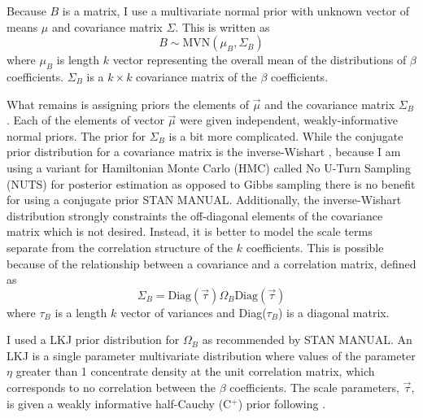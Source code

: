 \documentclass[12pt,letterpaper]{article}
\begin{document}
Because \(B\) is a matrix, I use a multivariate normal prior with unknown vector of means \(\mu\) and covariance matrix \(\Sigma\). This is written as 
\begin{equation}
  B \sim \mathrm{MVN}(\mu_{B}, \Sigma_{B})
  \label{eq:beta_prior}
\end{equation}
where \(\mu_{B}\) is length \(k\) vector representing the overall mean of the distributions of \(\beta\) coefficients. \(\Sigma_{B}\) is a \(k \times k\) covariance matrix of the \(\beta\) coefficients.

What remains is assigning priors the elements of \(\vec{\mu}\) and the covariance matrix \(\Sigma_{B}\). Each of the elements of vector \(\vec{\mu}\) were given independent, weakly-informative normal priors. The prior for \(\Sigma_{B}\) is a bit more complicated. While the conjugate prior distribution for a covariance matrix is the inverse-Wishart \citep{Gelman2013d}, because I am using a variant for Hamiltonian Monte Carlo (HMC) called No U-Turn Sampling (NUTS) for posterior estimation as opposed to Gibbs sampling there is no benefit for using a conjugate prior \uppercase{stan manual}. Additionally, the inverse-Wishart distribution strongly constraints the off-diagonal elements of the covariance matrix which is not desired. Instead, it is better to model the scale terms separate from the correlation structure of the \(k\) coefficients. This is possible because of the relationship between a covariance and a correlation matrix, defined as 
\begin{equation}
  \Sigma_{B} = \text{Diag}(\vec{\tau}) \Omega_{B} \text{Diag}(\vec{\tau})
  \label{eq:covcor}
\end{equation}
where \(\tau_{B}\) is a length \(k\) vector of variances and Diag(\(\tau_{B}\)) is a diagonal matrix.

I used a LKJ prior distribution for \(\Omega_{B}\) as recommended by \uppercase{stan manual}. An LKJ is a single parameter multivariate distribution where values of the parameter \(\eta\) greater than 1 concentrate density at the unit correlation matrix, which corresponds to no correlation between the \(\beta\) coefficients. The scale parameters, \(\vec{\tau}\), is given a weakly informative half-Cauchy (C\(^{+}\)) prior following \citet{Gelman2006a}.
\end{document}
